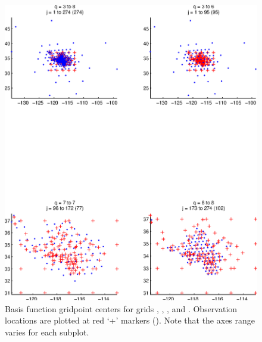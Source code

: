 \documentclass[11pt,titlepage,fleqn]{article}
\begin{document}
\begin{figure}
\includegraphics[width=16cm]{fig1D_3.eps}
\caption[]
{{
Basis function gridpoint centers for grids , , , and .
Observation locations are plotted at red `+' markers ().
Note that the axes range varies for each subplot.
\label{fig:fig1D_3}
}}
\end{figure}
\end{document}

